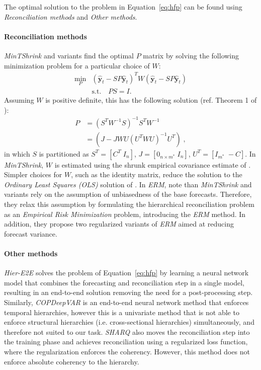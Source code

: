 \documentclass[preprint, 3p, times, twocolumn]{elsarticle}
\begin{document}
The optimal solution to the problem in Equation~\eqref{eq:hfp} can be found using \textit{Reconciliation methods} and \textit{Other methods}.

\paragraph{Reconciliation methods}

\textit{MinTShrink} \cite{wickramasuriya_optimal_2019} and variants find the optimal \(P\) matrix by solving the following minimization problem for a particular choice of \(W\):
\begin{align}
  \min_P &(\hat{\textbf{y}}_{t} - SP\hat{\textbf{y}}_{t})^T W (\hat{\textbf{y}}_{t} - SP\hat{\textbf{y}}_{t}) \nonumber \\
  & \text{s.t.} \quad PS=I. \label{eq:minp}
\end{align}
Assuming \(W\) is positive definite, this has the following solution (ref. Theorem 1 of \cite{wickramasuriya_optimal_2019}):
\begin{align} 
  P &= (S^TW^{-1}S)^{-1}S^TW^{-1} \nonumber \\
    &= (J - JWU(U^TWU)^{-1}U^T) \;, \label{eq:p1}
\end{align}
in which \(S\) is partitioned as \(S^T = [C^T \; I_n]\), \(J = [0_{n \times m^*} \; I_n]\), \(U^T = [I_{m^*} \; -C]\). In \textit{MinTShrink}, \(W\) is estimated using the shrunk empirical covariance estimate of \cite{schafer_shrinkage_2005}. Simpler choices for \(W\), such as the identity matrix, reduce the solution to the \textit{Ordinary Least Squares (OLS)} solution of \cite{hyndman_optimal_2011}. In \textit{ERM}, \citet{bentaieb_regularized_2019} note than \textit{MinTShrink} and variants rely on the assumption of unbiasedness of the base forecasts. Therefore, they relax this assumption by formulating the hierarchical reconciliation problem as an \textit{Empirical Risk Minimization} problem, introducing the \textit{ERM} method. In addition, they propose two regularized variants of \textit{ERM} aimed at reducing forecast variance. 

\paragraph{Other methods} \textit{Hier-E2E} \cite{rangapuram_endtoend_2021} solves the problem of Equation~\eqref{eq:hfp} by learning a neural network model that combines the forecasting and reconciliation step in a single model, resulting in an end-to-end solution removing the need for a post-processing step. Similarly, \textit{COPDeepVAR} \cite{rangapuram_coherent_2023} is an end-to-end neural network method that enforces temporal hierarchies, however this is a univariate method that is not able to enforce structural hierarchies (i.e. cross-sectional hierarchies) simultaneously, and therefore not suited to our task. \textit{SHARQ} \cite{han_simultaneously_2021} also moves the reconciliation step into the training phase and achieves reconciliation using a regularized loss function, where the regularization enforces the coherency. However, this method does not enforce absolute coherency to the hierarchy.
\end{document}
